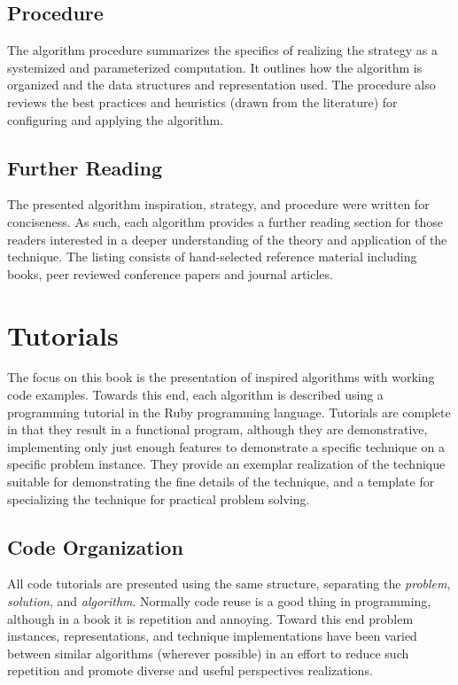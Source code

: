 \subsection{Procedure}
The algorithm procedure summarizes the specifics of realizing the strategy as a systemized and parameterized computation. It outlines how the algorithm is organized and the data structures and representation used. The procedure also reviews the best practices and heuristics (drawn from the literature) for configuring and applying the algorithm.

\subsection{Further Reading}
The presented algorithm inspiration, strategy, and procedure were written for conciseness. As such, each algorithm provides a further reading section for those readers interested in a deeper understanding of the theory and application of the technique. The listing consists of hand-selected reference material including books, peer reviewed conference papers and journal articles.

\section{Tutorials}
\label{sec:intro:tutorials}
The focus on this book is the presentation of inspired algorithms with working code examples. Towards this end, each algorithm is described using a programming tutorial in the Ruby programming language. Tutorials are complete in that they result in a functional program, although they are demonstrative, implementing only just enough features to demonstrate a specific technique on a specific problem instance. They provide an exemplar realization of the technique suitable for demonstrating the fine details of the technique, and a template for specializing the technique for practical problem solving. 

\subsection{Code Organization}
All code tutorials are presented using the same structure, separating the \emph{problem}, \emph{solution}, and \emph{algorithm}. Normally code reuse is a good thing in programming, although in a book it is repetition and annoying. Toward this end problem instances, representations, and technique implementations have been varied between similar algorithms (wherever possible) in an effort to reduce such repetition and promote diverse and useful perspectives realizations.

